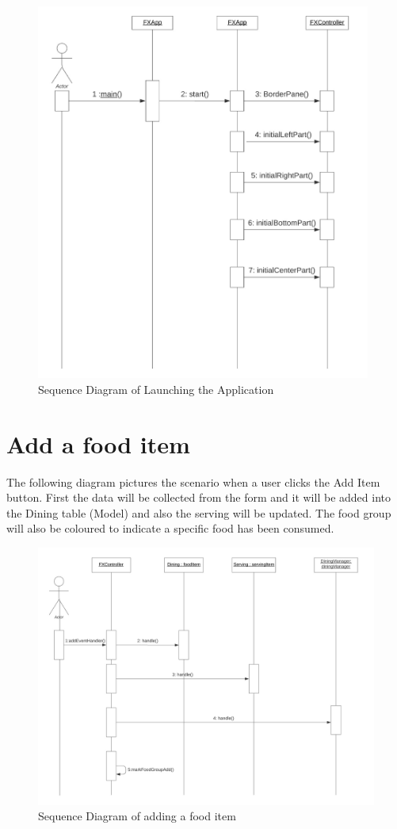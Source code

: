 \documentclass{scrreprt}
\begin{document}
\begin{figure}[!htbp]
\centering
\includegraphics[width=11cm]{pictures/launch-app.png}
\caption*{Sequence Diagram of Launching the Application}
\end{figure}

\FloatBarrier

\section{Add a food item}

The following diagram pictures the scenario when a user clicks the Add Item button. First the data will be collected from the form and it will be added into the Dining table (Model) and also the serving will be updated. The food group will also be coloured to indicate a specific food has been consumed.

\begin{figure}[!htbp]
\centering
\includegraphics[width=15cm]{pictures/add-food-sd.png}
\caption*{Sequence Diagram of adding a food item}
\end{figure}
\end{document}
